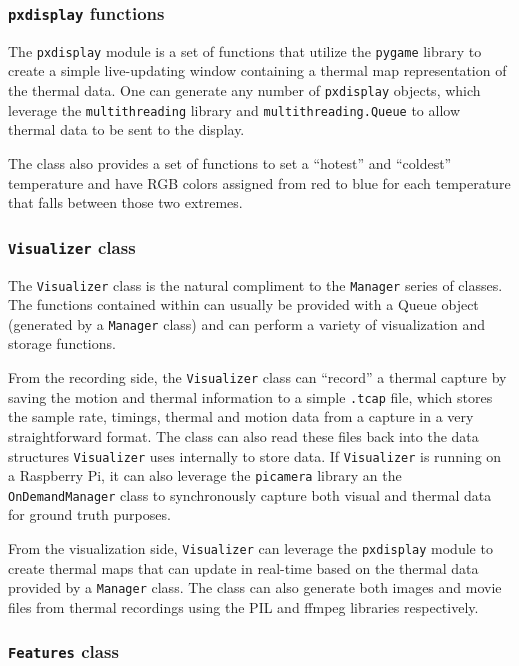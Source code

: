 \documentclass[../thesis/thesis.tex]{subfiles}
\begin{document}
\subsubsection*{\texttt{pxdisplay} functions}

The \texttt{pxdisplay} module is a set of functions that utilize the \texttt{pygame} library to create a simple live-updating window containing a thermal map representation of the thermal data. One can generate any number of \texttt{pxdisplay} objects, which leverage the \texttt{multithreading} library and \texttt{multithreading.Queue} to allow thermal data to be sent to the display.

The class also provides a set of functions to set a ``hotest'' and ``coldest'' temperature and have RGB colors assigned from red to blue for each temperature that falls between those two extremes.

\subsubsection*{\texttt{Visualizer} class}
The \texttt{Visualizer} class is the natural compliment to the \texttt{Manager} series of classes. The functions contained within can usually be provided with a Queue object (generated by a \texttt{Manager} class) and can perform a variety of visualization and storage functions.

From the recording side, the \texttt{Visualizer} class can ``record'' a thermal capture by saving the motion and thermal information to a simple \texttt{.tcap} file, which stores the sample rate, timings, thermal and motion data from a capture in a very straightforward format. The class can also read these files back into the data structures \texttt{Visualizer} uses internally to store data. If \texttt{Visualizer} is running on a Raspberry Pi, it can also leverage the \texttt{picamera} library an the \texttt{OnDemandManager} class to synchronously capture both visual and thermal data for ground truth purposes.

From the visualization side, \texttt{Visualizer} can leverage the \texttt{pxdisplay} module to create thermal maps that can update in real-time based on the thermal data provided by a \texttt{Manager} class. The class can also generate both images and movie files from thermal recordings using the PIL and ffmpeg libraries respectively.

\subsubsection*{\texttt{Features} class}
\end{document}
